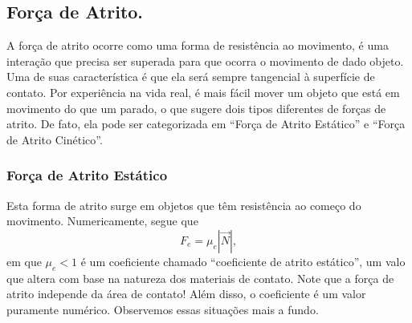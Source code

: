 \documentclass{article}
\begin{document}
\subsection{Força de Atrito.}
  A força de atrito ocorre como uma forma de resistência ao movimento, é uma interação que precisa ser superada para que ocorra
  o movimento de dado objeto. Uma de suas característica é que ela será sempre tangencial à superfície de contato.
  Por experiência na vida real, é mais fácil mover um objeto que está em movimento do que um parado, o que sugere dois tipos diferentes
  de forças de atrito. De fato, ela pode ser categorizada em ``Força de Atrito Estático'' e ``Força de Atrito Cinético''.
\begin{center}
\end{center}

\subsubsection{Força de Atrito Estático}
  Esta forma de atrito surge em objetos que têm resistência ao começo do movimento. Numericamente, segue que 
    $$
      F_{e} = \mu_{e}|\vec{N}|,
    $$
  em que $\mu_{e} < 1$ é um coeficiente chamado ``coeficiente de atrito estático'', um valo que altera com base na natureza
  dos materiais de contato. Note que a força de atrito independe da área de contato! Além disso, o coeficiente é um valor
  puramente numérico. Observemos essas situações mais a fundo.
\end{document}
